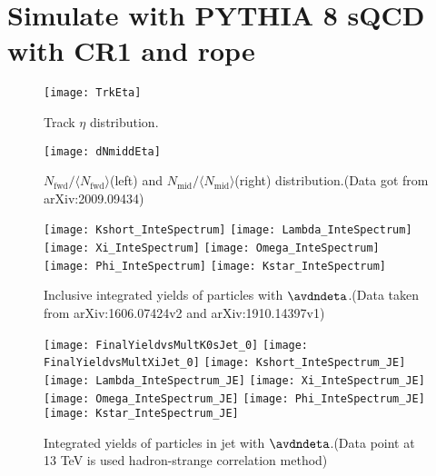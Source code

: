 
\section{Simulate with PYTHIA 8 sQCD with CR1 and rope}%
\label{sec:CRorRope}

\begin{figure}[t]
        \begin{center}
                \texttt{[image: TrkEta]}
        \end{center}
        \caption{Track $\eta$ distribution.}
        \label{fig:TrkEta}
\end{figure}

\begin{figure}[t]
	\begin{center}
		\texttt{[image: dNmiddEta]}
	\end{center}
	\caption{$N_\mathrm{fwd}/\langle N_\mathrm{fwd}\rangle$(left) and $N_\mathrm{mid}/\langle N_\mathrm{mid}\rangle$(right) distribution.(Data got from arXiv:2009.09434)}
	\label{fig:TrkdNdEta}
\end{figure}

\begin{figure}[ht]
	\begin{center}
		\texttt{[image: Kshort\_InteSpectrum]}
		\texttt{[image: Lambda\_InteSpectrum]}
		\texttt{[image: Xi\_InteSpectrum]}
		\texttt{[image: Omega\_InteSpectrum]}
		\texttt{[image: Phi\_InteSpectrum]}
		\texttt{[image: Kstar\_InteSpectrum]}
	\end{center}
	\caption{Inclusive integrated yields of particles with $\avdndeta$.(Data taken from arXiv:1606.07424v2 and arXiv:1910.14397v1)}
	\label{fig:InclIntePar}
\end{figure}
\begin{figure}[ht]
	\begin{center}
		\texttt{[image: FinalYieldvsMultK0sJet\_0]}
		\texttt{[image: FinalYieldvsMultXiJet\_0]}
		\texttt{[image: Kshort\_InteSpectrum\_JE]}
		\texttt{[image: Lambda\_InteSpectrum\_JE]}
		\texttt{[image: Xi\_InteSpectrum\_JE]}
		\texttt{[image: Omega\_InteSpectrum\_JE]}
		\texttt{[image: Phi\_InteSpectrum\_JE]}
		\texttt{[image: Kstar\_InteSpectrum\_JE]}
	\end{center}
	\caption{Integrated yields of particles in jet with $\avdndeta$.(Data point at 13 TeV is used hadron-strange correlation method)}
	\label{fig:JCIntePar}
\end{figure}

